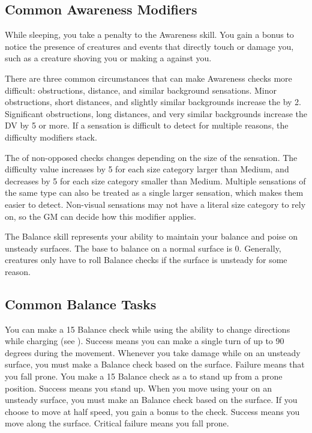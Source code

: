    \subsection{Common Awareness Modifiers}
        While sleeping, you take a  penalty to the Awareness skill.
        You gain a  bonus to notice the presence of creatures and events that directly touch or damage you, such as a creature shoving you or making a  against you.

        There are three common circumstances that can make Awareness checks more difficult: obstructions, distance, and similar background sensations.
        Minor obstructions, short distances, and slightly similar backgrounds increase the  by 2.
        Significant obstructions, long distances, and very similar backgrounds increase the DV by 5 or more.
        If a sensation is difficult to detect for multiple reasons, the difficulty modifiers stack.

        The  of non-opposed checks changes depending on the size of the sensation.
        The difficulty value increases by 5 for each size category larger than Medium, and decreases by 5 for each size category smaller than Medium.
        Multiple sensations of the same type can also be treated as a single larger sensation, which makes them easier to detect.
        Non-visual sensations may not have a literal size category to rely on, so the GM can decide how this modifier applies.

\newpage
{}
    The Balance skill represents your ability to maintain your balance and poise on unsteady surfaces.
    The base  to balance on a normal surface is 0.
    Generally, creatures only have to roll Balance checks if the surface is unsteady for some reason.

    \subsection{Common Balance Tasks}
        \label{Agile Charge} You can make a  15 Balance check while using the  ability to change directions while charging (see ).
        Success means you can make a single turn of up to 90 degrees during the movement.
         Whenever you take damage while on an unsteady surface, you must make a Balance check based on the surface.
        Failure means that you fall prone.
        \label{Rapid Stand} You make a  15 Balance check as a  to stand up from a prone position.
        Success means you stand up.
         When you move using your  on an unsteady surface, you must make an Balance check based on the surface.
        If you choose to move at half speed, you gain a  bonus to the check.
        Success means you move along the surface.
        Critical failure means you fall prone.


